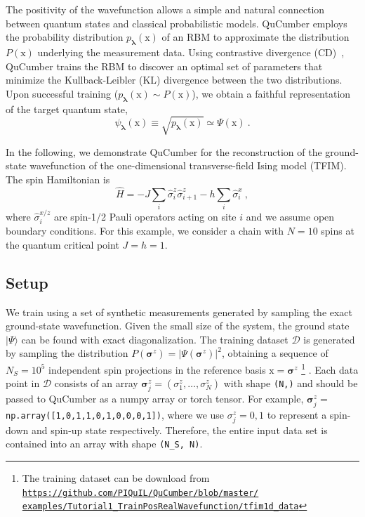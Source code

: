 \documentclass[submission, Phys, hidelnks]{SciPost}
\begin{document}
The positivity of the wavefunction allows a simple and natural connection between quantum states and classical probabilistic models. QuCumber employs the probability distribution $p_{\bm{\lambda}}(\bm{\mathrm{x}})$ of an RBM to approximate the distribution $P(\bm{\mathrm{x}})$ underlying the measurement data. Using contrastive divergence (CD)~\cite{hinton2002training}, QuCumber trains the RBM to discover an optimal set of parameters that minimize the Kullback-Leibler (KL) divergence between the two distributions. Upon successful training ($p_{\bm{\lambda}}(\bm{\mathrm{x}})\sim P(\bm{\mathrm{x}})$), we obtain a faithful representation of the target quantum state,
\begin{equation}\label{wfpd}
    \psi_{\bm{\lambda}}(\bm{\mathrm{x}}) \equiv \sqrt{p_{\bm{\lambda}}(\bm{\mathrm{x}})}
    \simeq\Psi(\bm{\mathrm{x}})\:.
\end{equation} 

In the following, we demonstrate QuCumber for the reconstruction of the ground-state wavefunction of the one-dimensional transverse-field Ising model (TFIM). The spin Hamiltonian is 
\begin{equation}
    \hat{H} = -J\sum_i \hat{\sigma}^z_i \hat{\sigma}^z_{i+1} - h \sum_i\hat{\sigma}^x_i\:, \label{TFIM}
\end{equation}
where $\hat{\sigma}^{x/z}_i$ are spin-1/2 Pauli operators acting on site $i$ and we assume open boundary conditions. For this example, we consider a chain with $N=10$ spins at the quantum critical point $J=h=1$.

\subsection{Setup}\label{subsec:example}
We train using a set of synthetic measurements generated by sampling the exact ground-state wavefunction. Given the small size of the system, the ground state $|\Psi\rangle$ can be found with exact diagonalization. The training dataset $\mathcal{D}$ is generated by sampling the distribution $P(\bm{\sigma}^z)=|\Psi(\bm{\sigma}^z)|^2$, obtaining a sequence of $N_S=10^5$ independent spin projections in the reference basis $\bm{\mathrm{x}} = \bm{\sigma}^z$ 
\footnote{The training dataset can be download from
    \href{https://github.com/PIQuIL/QuCumber/blob/master/examples/Tutorial1_TrainPosRealWavefunction/tfim1d_data.txt}{\texttt{https://github.com/PIQuIL/QuCumber/blob/master/\\examples/Tutorial1\_TrainPosRealWavefunction/tfim1d\_data}}
}
. Each data point in $\mathcal{D}$ consists of an array $\bm{\sigma}^z_j=(\sigma^z_1,\dots,\sigma^z_N)$ with shape \verb|(N,)| and should be passed to QuCumber as a numpy array or torch tensor. For example, $\bm{\sigma}^z_j=$ \verb|np.array([1,0,1,1,0,1,0,0,0,1])|, where we use $\sigma_j^z=0,1$ to represent a spin-down and spin-up state respectively. Therefore, the entire input data set is contained into an array with shape \verb|(N_S, N)|.
\end{document}
